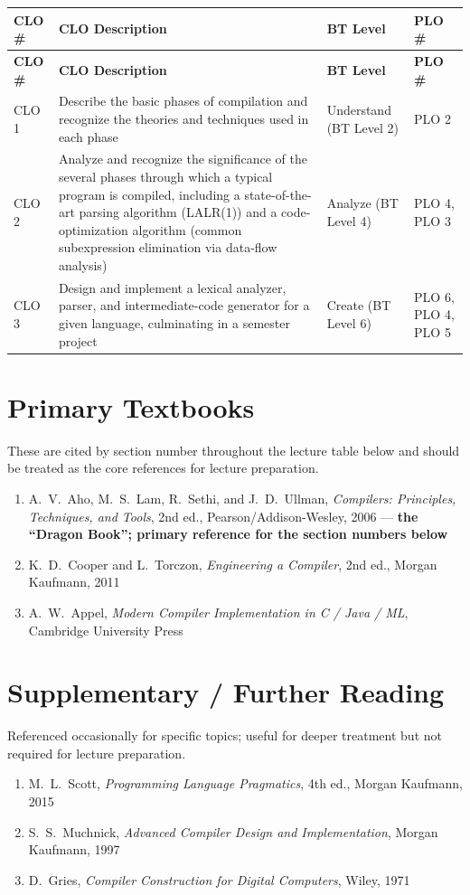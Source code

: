 \documentclass{article}
\begin{document}
\renewcommand{\arraystretch}{1.4}
\begin{longtable}{|l|p{9cm}|p{2.7cm}|p{2.2cm}|}
\hline
\textbf{CLO \#}  & \textbf{CLO Description} & \textbf{BT Level} & \textbf{PLO \#}\\ \hline
\endfirsthead
\hline
\textbf{CLO \#}  & \textbf{CLO Description} & \textbf{BT Level} & \textbf{PLO \#}\\ \hline
\endhead
CLO 1 & Describe the basic phases of compilation and recognize the theories and techniques used in each phase  & Understand (BT Level 2) & PLO 2 \\ \hline
       CLO 2 & Analyze and recognize the significance of the several phases through which a typical program is compiled, including a state-of-the-art parsing algorithm (LALR(1)) and a code-optimization algorithm (common subexpression elimination via data-flow analysis) & Analyze (BT Level 4) & PLO 4, PLO 3 \\ \hline
CLO 3 & Design and implement a lexical analyzer, parser, and intermediate-code generator for a given language, culminating in a semester project & Create (BT Level 6) & PLO 6, PLO 4, PLO 5 \\ \hline
\end{longtable}

\section*{Primary Textbooks}
These are cited by section number throughout the lecture table below and should be treated as the core references for lecture preparation.
\begin{enumerate}
    \item[{[DB]}] A.~V.~Aho, M.~S.~Lam, R.~Sethi, and J.~D.~Ullman, \textit{Compilers: Principles, Techniques, and Tools}, 2nd ed., Pearson/Addison-Wesley, 2006 --- \textbf{the ``Dragon Book''; primary reference for the section numbers below}
    \item[{[ET]}] K.~D.~Cooper and L.~Torczon, \textit{Engineering a Compiler}, 2nd ed., Morgan Kaufmann, 2011
    \item[{[AP]}] A.~W.~Appel, \textit{Modern Compiler Implementation in C / Java / ML}, Cambridge University Press
\end{enumerate}

\section*{Supplementary / Further Reading}
Referenced occasionally for specific topics; useful for deeper treatment but not required for lecture preparation.
\begin{enumerate}
    \item[{[PP]}] M.~L.~Scott, \textit{Programming Language Pragmatics}, 4th ed., Morgan Kaufmann, 2015
    \item[{[MU]}] S.~S.~Muchnick, \textit{Advanced Compiler Design and Implementation}, Morgan Kaufmann, 1997
    \item[{[GR]}] D.~Gries, \textit{Compiler Construction for Digital Computers}, Wiley, 1971
\end{enumerate}
\end{document}
